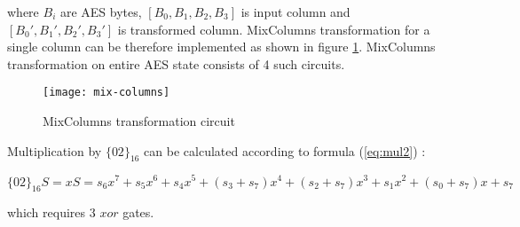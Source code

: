 where $B_i$ are AES bytes, $[B_0, B_1, B_2, B_3]$ is input column and $[B_0', B_1', B_2', B_3']$ is transformed column. MixColumns transformation for a single column can be therefore implemented as shown in figure \ref{fig:mix_columns}. MixColumns transformation on entire AES state consists of 4 such circuits.

\begin{figure}[!h]
\centering
\texttt{[image: mix-columns]}

\caption{MixColumns transformation circuit}
\label{fig:mix_columns}
\end{figure}

Multiplication by $\{02\}_{16}$ can be calculated according to formula (\ref{eq:mul2}) \cite{vlsi}: 

\begin{equation}
\label{eq:mul2}
\{02\}_{16}S = xS = s_6x^7 + s_5x^6 + s_4x^5 + (s_3 + s_7)x^4 + (s_2 + s_7)x^3 + s_1x^2 + (s_0 + s_7)x + s_7
\end{equation}

which requires 3 $xor$ gates.


